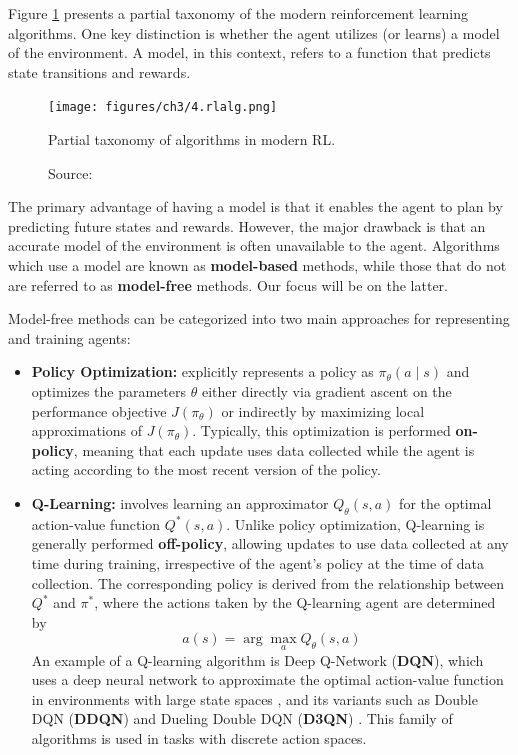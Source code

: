 Figure \ref{fig:mdp}
presents a partial taxonomy of the modern reinforcement learning algorithms.
One key distinction is whether the agent utilizes (or learns) a model of
the environment. A model, in this context, refers to a function that predicts
state transitions and rewards.

\begin{figure}[h]
    \centering
    \texttt{[image: figures/ch3/4.rlalg.png]}
    \caption{Partial taxonomy of algorithms in modern RL.}
    \vspace{-10px}
    \caption*{\scriptsize{Source: \cite{openaiPartKinds}}}
    \label{fig:mdp}
\end{figure}

The primary advantage of having a model is that it enables the agent
to plan by predicting future states and rewards.
However, the major drawback is that an accurate model of the environment
is often unavailable to the agent.
Algorithms which use a model are known as \textbf{model-based} methods,
while those that do not are referred to as \textbf{model-free} methods.
Our focus will be on the latter.

Model-free methods can be categorized into two main approaches
for representing and training agents:
\begin{itemize}
    \item \textbf{Policy Optimization:} explicitly represents a policy
    as \( \pi_{\theta}(a \mid s) \) and optimizes the parameters \( \theta \)
    either directly via gradient ascent on the performance objective
    \( J(\pi_{\theta}) \) or indirectly by maximizing local approximations
    of \( J(\pi_{\theta}) \).
    Typically, this optimization is performed \textbf{on-policy},
    meaning that each update uses data collected while the agent is acting
    according to the most recent version of the policy.

    \item \textbf{Q-Learning:} involves learning an approximator
    \( Q_{\theta}(s,a) \) for the optimal action-value function \( Q^*(s,a) \).
    Unlike policy optimization, Q-learning is generally performed \textbf{off-policy},
    allowing updates to use data collected at any time during training,
    irrespective of the agent's policy at the time of data collection.
    The corresponding policy is derived from the relationship between
    \( Q^* \) and \( \pi^* \), where the actions taken by the Q-learning
    agent are determined by
    \begin{equation}
    a(s) = \arg \max_a Q_{\theta}(s,a)
    \end{equation}
    An example of a Q-learning algorithm is Deep Q-Network (\textbf{DQN}),
    which uses a deep neural network to approximate the optimal action-value
    function in environments with large state spaces \cite{dqn},
    and its variants such as Double DQN (\textbf{DDQN})
    \cite{ddqn} and
    Dueling Double DQN (\textbf{D3QN}) \cite{d3qn}.
    This family of algorithms is used in tasks with discrete action spaces.

\end{itemize}

